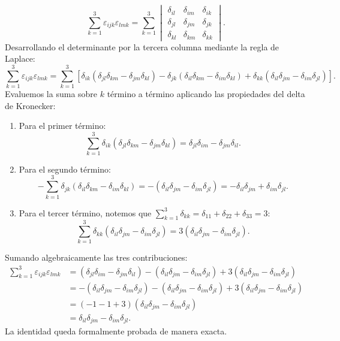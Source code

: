 \begin{appendices}
\begin{equation}
    \sum_{k=1}^3 \varepsilon_{ijk}\varepsilon_{lmk} = \sum_{k=1}^3 \begin{vmatrix}
        \delta_{il} & \delta_{im} & \delta_{ik} \\
        \delta_{jl} & \delta_{jm} & \delta_{jk} \\
        \delta_{kl} & \delta_{km} & \delta_{kk}
    \end{vmatrix}.
\end{equation}
Desarrollando el determinante por la tercera columna mediante la regla de Laplace:
\begin{equation}
    \sum_{k=1}^3 \varepsilon_{ijk}\varepsilon_{lmk} = \sum_{k=1}^3 \left[ \delta_{ik} (\delta_{jl}\delta_{km} - \delta_{jm}\delta_{kl}) - \delta_{jk} (\delta_{il}\delta_{km} - \delta_{im}\delta_{kl}) + \delta_{kk} (\delta_{il}\delta_{jm} - \delta_{im}\delta_{jl}) \right].
\end{equation}
Evaluemos la suma sobre $k$ término a término aplicando las propiedades del delta de Kronecker:
\begin{enumerate}
    \item Para el primer término:
    \begin{equation}
        \sum_{k=1}^3 \delta_{ik} (\delta_{jl}\delta_{km} - \delta_{jm}\delta_{kl}) = \delta_{jl}\delta_{im} - \delta_{jm}\delta_{il}.
    \end{equation}
    \item Para el segundo término:
    \begin{equation}
        -\sum_{k=1}^3 \delta_{jk} (\delta_{il}\delta_{km} - \delta_{im}\delta_{kl}) = -(\delta_{il}\delta_{jm} - \delta_{im}\delta_{jl}) = -\delta_{il}\delta_{jm} + \delta_{im}\delta_{jl}.
    \end{equation}
    \item Para el tercer término, notemos que $\sum_{k=1}^3 \delta_{kk} = \delta_{11} + \delta_{22} + \delta_{33} = 3$:
    \begin{equation}
        \sum_{k=1}^3 \delta_{kk} (\delta_{il}\delta_{jm} - \delta_{im}\delta_{jl}) = 3 (\delta_{il}\delta_{jm} - \delta_{im}\delta_{jl}).
    \end{equation}
\end{enumerate}
Sumando algebraicamente las tres contribuciones:
\begin{align}
    \sum_{k=1}^3 \varepsilon_{ijk}\varepsilon_{lmk} &= (\delta_{jl}\delta_{im} - \delta_{jm}\delta_{il}) - (\delta_{il}\delta_{jm} - \delta_{im}\delta_{jl}) + 3(\delta_{il}\delta_{jm} - \delta_{im}\delta_{jl}) \nonumber\\
    &= -(\delta_{il}\delta_{jm} - \delta_{im}\delta_{jl}) - (\delta_{il}\delta_{jm} - \delta_{im}\delta_{jl}) + 3(\delta_{il}\delta_{jm} - \delta_{im}\delta_{jl}) \nonumber\\
    &= (-1 - 1 + 3)(\delta_{il}\delta_{jm} - \delta_{im}\delta_{jl}) \nonumber\\
    &= \boxed{\delta_{il}\delta_{jm} - \delta_{im}\delta_{jl}}.
\end{align}
La identidad queda formalmente probada de manera exacta.


\end{appendices}
